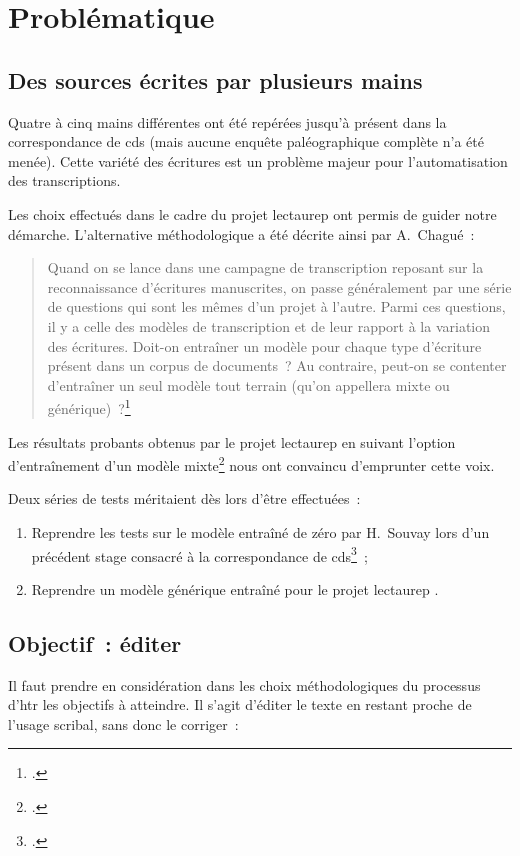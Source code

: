 \documentclass[a4paper,12pt,twoside]{book}
\begin{document}
		\section{Problématique}
			
			\subsection{Des sources écrites par plusieurs mains}
				Quatre à cinq mains différentes ont été repérées jusqu'à présent dans la correspondance de \gls{cds} (mais aucune enquête paléographique complète n'a été menée). Cette variété des écritures est un problème majeur pour l'automatisation des transcriptions.
				
				Les choix effectués dans le cadre du projet \gls{lectaurep} ont permis de guider notre démarche. L'alternative méthodologique a été décrite ainsi par A.~Chagué~:
				
				\begin{quotation}
					Quand on se lance dans une campagne de transcription reposant sur la reconnaissance d’écritures manuscrites, on passe généralement par une série de questions qui sont les mêmes d’un projet à l’autre. Parmi ces questions, il y a celle des modèles de transcription et de leur rapport à la variation des écritures. Doit-on entraîner un modèle pour chaque type d’écriture présent dans un corpus de documents~? Au contraire, peut-on se contenter d’entraîner un seul modèle tout terrain (qu’on appellera mixte ou générique)~?\footcite{chagueCreationModelesTranscription}
				\end{quotation}
			
				Les résultats probants obtenus par le projet \gls{lectaurep} en suivant l'option d'entraînement d'un modèle mixte\footcite{chagueCreationModelesTranscriptiona} nous ont convaincu d'emprunter cette voix.
			
				Deux séries de tests méritaient dès lors d'être effectuées~:
		
				\begin{enumerate}
					\item Reprendre les tests sur le modèle entraîné de zéro par H.~Souvay lors d'un précédent stage consacré à la correspondance de \gls{cds}\footcite{souvayCorrespondanceConstanceSalm2021}~;
					\item Reprendre un modèle générique entraîné pour le projet \gls{lectaurep} .
				\end{enumerate}
		
			\subsection{Objectif~: éditer}
				Il faut prendre en considération dans les choix méthodologiques du processus d'\gls{htr} les objectifs à atteindre. Il s'agit d'éditer le texte en restant proche de l'usage scribal, sans donc le corriger~:
				
\end{document}
